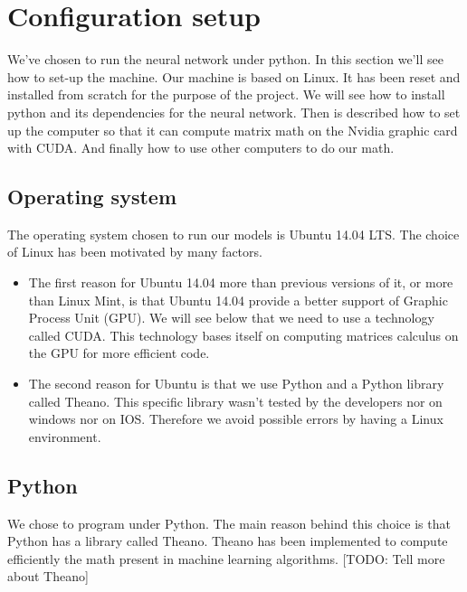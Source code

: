 


\section{Configuration setup}
	
	We've chosen to run the neural network under python. In this section we'll see how to set-up the machine. Our machine is based on Linux. It has been reset and installed from scratch for the purpose of the project. We will see how to install python and its dependencies for the neural network. Then is described how to set up the computer so that it can compute matrix math on the Nvidia graphic card with CUDA. And finally how to use other computers to do our math.


	\subsection{Operating system}
		The operating system chosen to run our models is Ubuntu 14.04 LTS. The choice of Linux has been motivated by many factors. 

		\begin{itemize}
			
			\item The first reason for Ubuntu 14.04 more than previous versions of it, or more than Linux Mint, is that Ubuntu 14.04 provide a better support of Graphic Process Unit (GPU). We will see below that we need to use a technology called CUDA. This technology bases itself on computing matrices calculus on the GPU for more efficient code.

			\item The second reason for Ubuntu is that we use Python and a Python library called Theano. This specific library wasn't tested by the developers nor on windows nor on IOS. Therefore we avoid possible errors by having a Linux environment.



		\end{itemize}


	\subsection{Python}
		We chose to program under Python. The main reason behind this choice is that Python has a library called Theano.
		Theano has been implemented to compute efficiently the math present in machine learning algorithms. 
		[TODO: Tell more about Theano]

